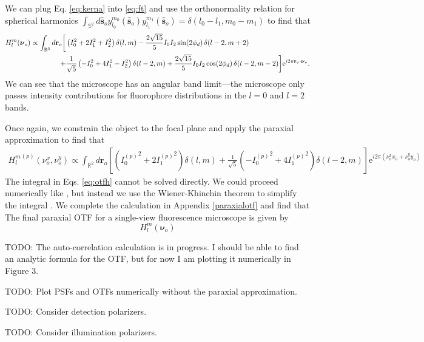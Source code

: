 \documentclass[11pt]{article}
\newcommand{\me}{\mathrm{e}}
\providecommand{\mb}[1]{\mathbf{#1}}
\providecommand{\ro}[1]{\mathbf{\mathbf{r}}_o}
\providecommand{\so}[1]{\mathbf{\hat{s}}_o}
\providecommand{\bs}[1]{\boldsymbol{#1}}
\begin{document}
We can plug Eq. \ref{eq:kerna} into \ref{eq:ft} and use the orthonormality
relation for spherical harmonics $\int_{\mathbb{S}^2}d\so{} y_{l_0}^{m_0}(\so{})y_{l_1}^{m_1}(\so{}) = \delta(l_0 - l_1, m_0 - m_1)$ to find that
\begin{equation}
  \begin{split}
  H_l^m(\bs{\nu}_o) \propto \int_{\mathbb{R}^3}d\ro{}  \bigg[&\left(I_0^2 + 2I_1^2 + I_2^2\right) \delta(l, m) - \frac{2\sqrt{15}}{5}I_0I_2\sin(2\phi_d)\thinspace \delta(l-2, m+2)\\ +& \frac{1}{\sqrt{5}}\left(-I_0^2 + 4I_1^2 - I_2^2\right) \delta(l-2, m) +\frac{2\sqrt{15}}{5}I_0I_2\cos(2\phi_d) \thinspace \delta(l-2, m-2)\bigg]\me^{i 2\pi \ro{}\cdot\bs{\nu}_o}.\label{eq:otf}
\end{split}
\end{equation}
We can see that the microscope has an angular band limit---the microscope only
passes intensity contributions for fluorophore distributions in the $l=0$ and
$l=2$ bands.

Once again, we constrain the object to the focal plane and apply the paraxial
approximation to find that
\begin{align}
  {H_l^m}^{(p)}(\nu_o^x, \nu_o^y) \propto \int_{\mathbb{R}^2}d\mb{r}_o\left[\left({I_0^{(p)}}^2 + 2{I_1^{(p)}}^2\right)\delta(l, m) + \frac{1}{\sqrt{5}}\left(-{I_0^{(p)}}^2 + 4{I_1^{(p)}}^2\right)\delta(l-2, m)\right]  \me^{i 2\pi(\nu_o^xx_o + \nu_o^yy_o)}\label{eq:otfh}
\end{align}
The integral in Eqs. \ref{eq:otfh} cannot be solved directly. We could proceed
numerically like \cite{backer2014}, but instead we use the Wiener-Khinchin
theorem to simplify the integral \cite{goodman1996, papoulis2002}. We complete
the calculation in Appendix \ref{paraxialotf} and find that
The final paraxial OTF for a single-view fluorescence microscope is
given by
\begin{equation}
  H_l^m(\bs{\nu}_o)
\end{equation}

TODO: The auto-correlation calculation is in progress. I should be able to find an
analytic formula for the OTF, but for now I am plotting it numerically in Figure 3.

TODO: Plot PSFs and OTFs numerically without the paraxial approximation.

TODO: Consider detection polarizers.

TODO: Consider illumination polarizers.
\end{document}

